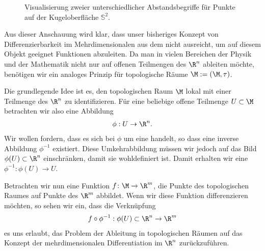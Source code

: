 \documentclass[letterpaper,10pt,english]{jupyterBook}
\let\sphinxpxdimen\pdfpxdimen\else\newdimen\sphinxpxdimen
\begin{document}
\begin{figure}[htbp]
\centering
\capstart

\noindent\sphinxincludegraphics[height=300\sphinxpxdimen]{{mannigfaltigkeit}.png}
\caption{Visualisierung zweier unterschiedlicher Abstandsbegriffe für Punkte auf der Kugeloberfläche \(\mathbb{S}^2\).}\label{\detokenize{manifolds/manifolds_prelim:fig-kugel}}\end{figure}

\sphinxAtStartPar
Aus dieser Anschauung wird klar, dass unser bisheriges Konzept von Differenzierbarkeit im Mehrdimensionalen aus dem  nicht ausreicht, um auf diesem Objekt geeignet Funktionen abzuleiten.
Da man in vielen Bereichen der Physik und der Mathematik nicht nur auf offenen Teilmengen des \(\R^n\) ableiten möchte, benötigen wir ein analoges Prinzip für topologische Räume \(\M := (\M, \tau)\).

\sphinxAtStartPar
{}

\sphinxAtStartPar
Die grundlegende Idee ist es, den topologischen Raum \(\M\) lokal mit einer Teilmenge des \(\R^n\) zu identifizieren.
Für eine beliebige offene Teilmenge \(U\subset \M\) betrachten wir also eine Abbildung
\begin{equation*}
\begin{split}\phi:U\rightarrow \R^n.\end{split}
\end{equation*}
\sphinxAtStartPar
Wir wollen fordern, dass es sich bei \(\phi\) um eine  handelt, so dass eine inverse Abbildung \(\phi^{-1}\) existiert.
Diese Umkehrabbildung müssen wir jedoch auf das Bild \(\phi(U) \subset \R^n\) einschränken, damit sie wohldefiniert ist.
Damit erhalten wir eine  \(\phi^{-1}:\phi(U)\rightarrow U\).

\sphinxAtStartPar
Betrachten wir nun eine Funktion \(f \colon \M \rightarrow \R^m\), die Punkte des topologischen Raumes auf Punkte des \(\R^m\) abbildet.
Wenn wir diese Funktion differenzieren möchten, so sehen wir ein, dass die Verknüpfung
\begin{equation*}
\begin{split}f \circ \phi^{-1} : \phi(U) \subset \R^n \to \R^m\end{split}
\end{equation*}
\sphinxAtStartPar
es uns erlaubt, das Problem der Ableitung in topologischen Räumen auf das Konzept der mehrdimensionalen Differentiation im \(\R^n\) zurückzuführen.
\end{document}
